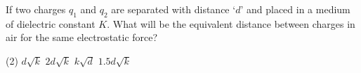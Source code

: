 \item If two charges \( q_1 \) and \( q_2 \) are separated with distance ‘\( d \)’ and placed in a medium of dielectric constant \( K \). What will be the equivalent distance between charges in air for the same electrostatic force?
    \begin{tasks}(2)
        \task \( d\sqrt{k} \)
        \task \( 2d\sqrt{k} \)
        \task \( k\sqrt{d} \)
        \task \( 1.5d\sqrt{k} \)
    \end{tasks}